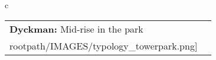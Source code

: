 \begin{table}[H]
        \begin{tabular}{c}
        \begin{tabular}{m{1.5in} m{2in}}
\textbf{Dyckman:} {Mid-rise in the park} & \texttt{[image: \\rootpath/IMAGES/typology\_towerpark.png]}
\end{tabular}\end{tabular}
        \end{table}